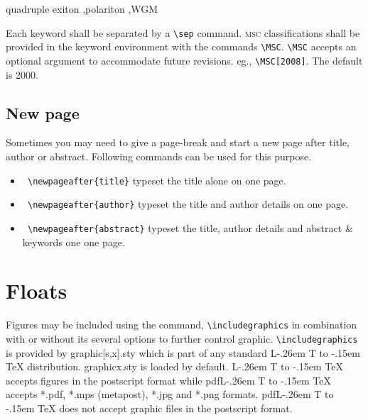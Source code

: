 \documentclass[a4paper,12pt]{article}
\makeatletter
\def\file#1{\textsf{#1}\xspace}
\DeclareRobustCommand{\LaTeX}{L\kern-.26em%
        {\sbox\z@ T%
         \vbox to\ht\z@{\hbox{\check@mathfonts
           \fontsize\sf@size\z@
           \math@fontsfalse\selectfont
          A\,}%
         \vss}%
        }%
     \kern-.15em%
    \TeX}
\makeatother
\begin{document}
\vspace*{-.5pc}
\begin{vquote}
 \begin{keyword}
  quadruple exiton \sep polariton \sep WGM
 \end{keyword}
\end{vquote}

\noindent Each keyword shall be separated by a \verb+\sep+ command.
\textsc{msc} classifications shall be provided in 
the keyword environment with the commands
\verb+\MSC+. \verb+\MSC+ accepts an optional
argument to accommodate future revisions.
eg., \verb=\MSC[2008]=. The default is 2000.

\subsection{New page}
Sometimes you may need to give a page-break and start a new page after
title, author or abstract. Following commands can be used for this
purpose.

\begin{vquote}
\end{vquote}


\begin{itemize}
\leftskip-2pc
\item [] {\tt\color{verbcolor} \verb+\newpageafter{title}+} typeset the title alone on one page.

\item [] {\tt\color{verbcolor} \verb+\newpageafter{author}+}  typeset the title
and author details on one page.

\item [] {\tt\color{verbcolor} \verb+\newpageafter{abstract}+}
typeset the title,
author details and abstract \& keywords one one page.

\end{itemize}

\section{Floats}
{Figures} may be included using the command, \verb+\includegraphics+ in
combination with or without its several options to further control
graphic. \verb+\includegraphics+ is provided by \file{graphic[s,x].sty}
which is part of any standard \LaTeX{} distribution.
\file{graphicx.sty} is loaded by default. \LaTeX{} accepts figures in
the postscript format while pdf\LaTeX{} accepts \file{*.pdf},
\file{*.mps} (metapost), \file{*.jpg} and \file{*.png} formats. 
pdf\LaTeX{} does not accept graphic files in the postscript format. 
\end{document}
